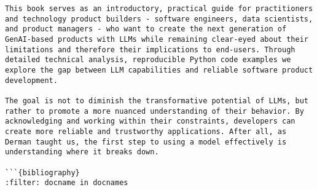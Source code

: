\begin{verbatim}
This book serves as an introductory, practical guide for practitioners and technology product builders - software engineers, data scientists, and product managers - who want to create the next generation of GenAI-based products with LLMs while remaining clear-eyed about their limitations and therefore their implications to end-users. Through detailed technical analysis, reproducible Python code examples we explore the gap between LLM capabilities and reliable software product development.

The goal is not to diminish the transformative potential of LLMs, but rather to promote a more nuanced understanding of their behavior. By acknowledging and working within their constraints, developers can create more reliable and trustworthy applications. After all, as Derman taught us, the first step to using a model effectively is understanding where it breaks down.

```{bibliography}
:filter: docname in docnames
\end{verbatim}
